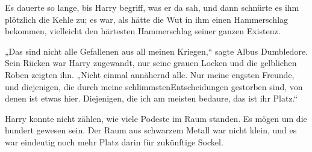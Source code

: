 Es dauerte so lange, bis Harry begriff, was er da sah, und dann schnürte es ihm plötzlich die Kehle zu; es war, als hätte die Wut in ihm einen Hammerschlag bekommen, vielleicht den härtesten Hammerschlag seiner ganzen Existenz.

„Das sind nicht alle Gefallenen aus all meinen Kriegen,“ sagte Albus Dumbledore. Sein Rücken war Harry zugewandt, nur seine grauen Locken und die gelblichen Roben zeigten ihn. „Nicht einmal annähernd alle. Nur meine engsten Freunde, und diejenigen, die durch meine schlimmstenEntscheidungen gestorben sind, von denen ist etwas hier. Diejenigen, die ich am meisten bedaure, das ist ihr Platz.“

Harry konnte nicht zählen, wie viele Podeste im Raum standen. Es mögen um die hundert gewesen sein. Der Raum aus schwarzem Metall war nicht klein, und es war eindeutig noch mehr Platz darin für zukünftige Sockel.

